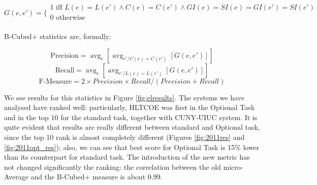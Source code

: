 \documentclass[a4paper,11pt]{report}
\newcommand{\avg}{\operatorname{avg}}
\begin{document}
$$G(e,e') =
\bigg \{
\begin{array}{l}
1 \text{ iff } L(e) = L(e') \land C(e) = C(e') \land GI(e) = SI(e) = GI(e') = SI(e') \\
0 \text{ otherwise}\\
\end{array}
$$

B-Cubed+ statistics are, formally:

$$
\text{Precision} = \avg_e [\avg_{e'/C(e)=C(e')} [G(e,e')]]
$$
$$
\text{Recall} = \avg_e [\avg_{e'/L(e)=L(e')} [G(e,e')]]
$$
$$
\text{F-Measure} = 2\times Precision \times Recall / (Precision + Recall)
$$

We see results for this statistics in Figure \ref{fig:elresults}. The systems we have analysed  have ranked well: particularly, HLTCOE was first in the Optional Task and in the top 10 for the standard task, together with CUNY-UIUC system. It is quite evident that results are really different between standard and Optional task, since the top 10 rank is almost completely different (Figures \ref{fig:2011res} and \ref{fig:2011opt_res}); also, we can see that best score for Optional Task is 15\% lower than its counterpart for standard task. The introduction of the new metric has not changed significantly the ranking: the correlation between the old micro-Average and the B-Cubed+ measure is about 0.99.
\end{document}
